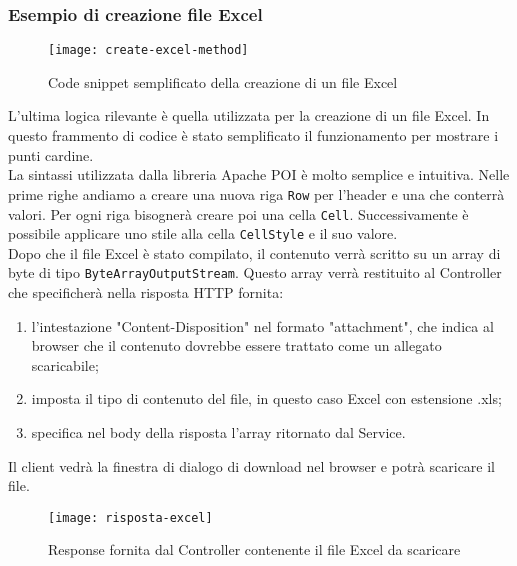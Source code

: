 \subsubsection{Esempio di creazione file Excel}
\begin{figure}[H] 
    \centering 
    \texttt{[image: create-excel-method]} 
    \caption{Code snippet semplificato della creazione di un file Excel}
\end{figure}
L'ultima logica rilevante è quella utilizzata per la creazione di un file Excel. In questo frammento di codice è stato semplificato il funzionamento per mostrare i punti cardine.\\
La sintassi utilizzata dalla libreria Apache POI è molto semplice e intuitiva. Nelle prime righe andiamo a creare una nuova riga \texttt{Row} per l'header e una che conterrà valori. Per ogni riga bisognerà creare poi una cella \texttt{Cell}. Successivamente è possibile applicare uno stile alla cella \texttt{CellStyle} e il suo valore.\\
Dopo che il file Excel è stato compilato, il contenuto verrà scritto su un array di byte di tipo \texttt{ByteArrayOutputStream}.
Questo array verrà restituito al Controller che specificherà nella risposta HTTP fornita:
\begin{enumerate}
\item l'intestazione "Content-Disposition" nel formato "attachment", che indica al browser che il contenuto dovrebbe essere trattato come un allegato scaricabile;
\item imposta il tipo di contenuto del file, in questo caso Excel con estensione .xls;
\item specifica nel body della risposta l'array ritornato dal Service.
\end{enumerate}
Il client vedrà la finestra di dialogo di download nel browser e potrà scaricare il file.
\begin{figure}[H] 
    \centering 
    \texttt{[image: risposta-excel]} 
    \caption{Response fornita dal Controller contenente il file Excel da scaricare}
\end{figure}